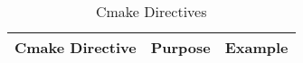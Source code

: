 \begin{table}
\centering
\caption{Cmake Directives}
\label{CDirec}
\begin{tabular}{lll}
\hline
\multicolumn{1}{|l|}{\textbf{Cmake Directive}} & \multicolumn{1}{l|}{\textbf{Purpose}}                                                                                                                                                                                                          & \multicolumn{1}{l|}{\textbf{Example}}                                                                                                                                                                                                                                                                                                                                                                                                                                                                                                                                                                                                                                                                                                                                                                              \\ \hline

\end{tabular}
\end{table}
